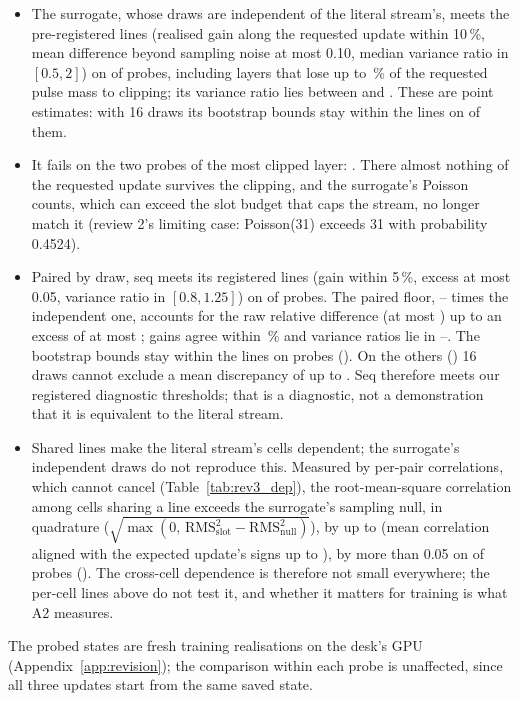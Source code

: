 \begin{itemize}
\item The surrogate, whose draws are independent of the literal stream's, meets the pre-registered lines (realised gain along
      the requested update within 10\,\%, mean difference beyond sampling noise at most 0.10, median variance ratio in
      $[0.5, 2]$) on \RYProbeSurMeetsN{} of \RYProbeN{} probes, including layers that lose up to \RYProbeOkLostMax\,\% of the
      requested pulse mass to clipping; its variance ratio lies between \RYProbeSurVarMin{} and \RYProbeSurVarMax. These are
      point estimates: with 16 draws its bootstrap bounds stay within the lines on \RYProbeSurAtNinetyFiveN{} of them.
\item It fails on the two probes of the most clipped layer: \RYProbeSurFailList. There almost nothing of the requested update
      survives the clipping, and the surrogate's Poisson counts, which can exceed the slot budget that caps the stream, no longer
      match it (review 2's limiting case: Poisson(31) exceeds 31 with probability 0.4524).
\item Paired by draw, seq meets its registered lines (gain within 5\,\%, excess at most 0.05, variance ratio in
      $[0.8, 1.25]$) on \RYProbeSeqMeetsN{} of \RYProbeN{} probes. The paired floor, \RYProbeFloorRatioMin--\RYProbeFloorRatioMax{}
      times the independent one, accounts for the raw relative difference (at most \RYProbeSeqRawMax) up to an excess of at
      most \RYProbeSeqExcessMax; gains agree within \RYProbeSeqGainDevMax\,\% and variance ratios lie in
      \RYProbeSeqVarMin--\RYProbeSeqVarMax. The bootstrap bounds stay within the lines on \RYProbeSeqAtNinetyFiveN{} probes
      (\RYProbeSeqAtNinetyFiveList). On the others (\RYProbeSeqNotNinetyFiveList) 16 draws cannot exclude a mean discrepancy of
      up to \RYProbeSeqExcessPNinetyFiveMax. Seq therefore meets our registered diagnostic thresholds; that is a diagnostic,
      not a demonstration that it is equivalent to the literal stream.
\item Shared lines make the literal stream's cells dependent; the surrogate's independent draws do not reproduce this.
      Measured by per-pair correlations, which cannot cancel (Table~\ref{tab:rev3_dep}), the root-mean-square correlation among
      cells sharing a line exceeds the surrogate's sampling null, in quadrature
      ($\sqrt{\max(0,\,\mathrm{RMS}_{\mathrm{slot}}^2-\mathrm{RMS}_{\mathrm{null}}^2)}$), by up to \RYDepExcessMax{} (mean correlation aligned with the
      expected update's signs up to \RYDepAlignedMax), by more than 0.05 on \RYDepLargeN{} of \RYProbeN{} probes
      (\RYDepLargeList). The cross-cell dependence is therefore not small everywhere; the per-cell lines above do not test it, and whether it
      matters for training is what A2 measures.
\end{itemize}
The probed states are fresh training realisations on the desk's GPU (Appendix~\ref{app:revision}); the comparison within each
probe is unaffected, since all three updates start from the same saved state.

